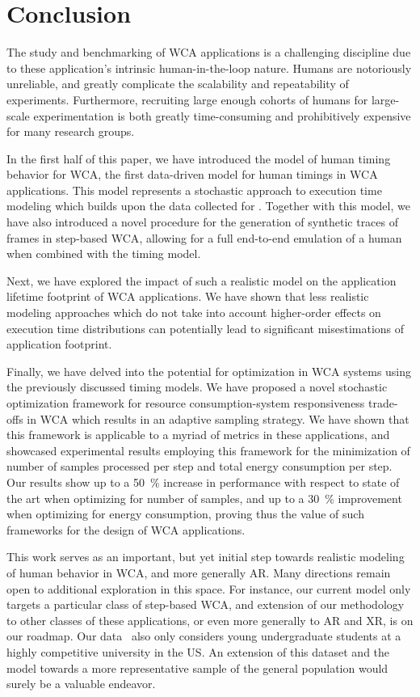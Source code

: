 \section{Conclusion}\label{sec:conclusion}

The study and benchmarking of \ac{WCA} applications is a challenging discipline due to these application's intrinsic human-in-the-loop nature.
Humans are notoriously unreliable, and greatly complicate the scalability and repeatability of experiments.
Furthermore, recruiting large enough cohorts of humans for large-scale experimentation is both greatly time-consuming and prohibitively expensive for many research groups.

In the first half of this paper, we have introduced the \edgedroid{} model of human timing behavior for \ac{WCA}, the first data-driven model for human timings in \ac{WCA} applications.
This model represents a stochastic approach to execution time modeling which builds upon the data collected for \textcite{olguinmunoz:impact2021}.
Together with this model, we have also introduced a novel procedure for the generation of synthetic traces of frames in step-based \ac{WCA}, allowing for a full end-to-end emulation of a human when combined with the timing model.

Next, we have explored the impact of such a realistic model on the application lifetime footprint of \ac{WCA} applications.
We have shown that less realistic modeling approaches which do not take into account higher-order effects on execution time distributions can potentially lead to significant misestimations of application footprint.

Finally, we have delved into the potential for optimization in \ac{WCA} systems using the previously discussed timing models.
We have proposed a novel stochastic optimization framework for resource consumption-system responsiveness trade-offs in \ac{WCA} which results in an adaptive sampling strategy. 
We have shown that this framework is applicable to a myriad of metrics in these applications, and showcased experimental results employing this framework for the minimization of number of samples processed per step and total energy consumption per step.
Our results show up to a \SI{50}{\percent} increase in performance with respect to state of the art when optimizing for number of samples, and up to a \SI{30}{\percent} improvement when optimizing for energy consumption, proving thus the value of such frameworks for the design of \ac{WCA} applications.

This work serves as an important, but yet initial step towards realistic modeling of human behavior in \ac{WCA}, and more generally \ac{AR}.
Many directions remain open to additional exploration in this space.
For instance, our current model only targets a particular class of step-based \ac{WCA}, and extension of our methodology to other classes of these applications, or even more generally to \ac{AR} and \ac{XR}, is on our roadmap.
Our data~\cite{olguinmunoz:impact2021} also only considers young undergraduate students at a highly competitive university in the US.\@
An extension of this dataset and the model towards a more representative sample of the general population would surely be a valuable endeavor.

